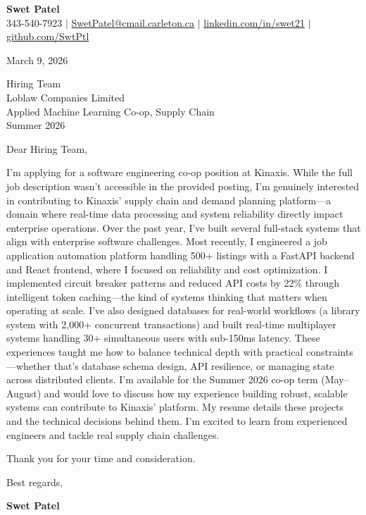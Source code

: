 \documentclass[letterpaper,11pt]{article}
\begin{document}
\begin{center}
    \textbf{\Large Swet Patel} \\[4pt]
    \small 343-540-7923 $|$
    \href{mailto:SwetPatel@cmail.carleton.ca}{SwetPatel@cmail.carleton.ca} $|$
    \href{https://linkedin.com/in/swet21}{linkedin.com/in/swet21} $|$
    \href{https://github.com/SwtPtl}{github.com/SwtPtl}
\end{center}

\vspace{8pt}
March 9, 2026

\vspace{8pt}
Hiring Team \\
Loblaw Companies Limited \\
Applied Machine Learning Co-op, Supply Chain \\
Summer 2026

\vspace{12pt}
Dear Hiring Team,


I'm applying for a software engineering co-op position at Kinaxis. While the full job description wasn't accessible in the provided posting, I'm genuinely interested in contributing to Kinaxis' supply chain and demand planning platform—a domain where real-time data processing and system reliability directly impact enterprise operations. \vspace{12pt} Over the past year, I've built several full-stack systems that align with enterprise software challenges. Most recently, I engineered a job application automation platform handling 500+ listings with a FastAPI backend and React frontend, where I focused on reliability and cost optimization. I implemented circuit breaker patterns and reduced API costs by 22\% through intelligent token caching—the kind of systems thinking that matters when operating at scale. I've also designed databases for real-world workflows (a library system with 2,000+ concurrent transactions) and built real-time multiplayer systems handling 30+ simultaneous users with sub-150ms latency. These experiences taught me how to balance technical depth with practical constraints—whether that's database schema design, API resilience, or managing state across distributed clients. \vspace{12pt} I'm available for the Summer 2026 co-op term (May–August) and would love to discuss how my experience building robust, scalable systems can contribute to Kinaxis' platform. My resume details these projects and the technical decisions behind them. I'm excited to learn from experienced engineers and tackle real supply chain challenges.

\vspace{12pt}
Thank you for your time and consideration.

\vspace{16pt}
Best regards,

\vspace{4pt}
\textbf{Swet Patel}
\end{document}
